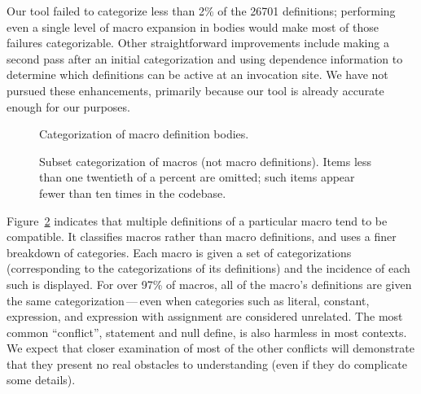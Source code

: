 \documentclass[11pt]{article}
\begin{document}
Our tool failed to categorize less than 2\% of the 26701 definitions;
performing even a single level of macro expansion in bodies would make most
of those failures categorizable.  Other straightforward improvements
include making a second pass after an initial categorization and using
dependence information to determine which definitions can be active at an
invocation site.  We have not pursued these enhancements, primarily because
our tool is already accurate enough for our purposes.


\begin{figure}
\centerline{}
\caption{Categorization of macro definition bodies.}
\label{fig:categorization}
\end{figure}







\begin{figure}
{\small\centerline{}}
\caption{Subset categorization of macros (not macro definitions).   Items
  less than one twentieth of a percent are omitted; such items appear
  fewer than ten times in the codebase.}
\label{fig:subset-categories}
\end{figure}
 
Figure~\ref{fig:subset-categories} indicates that multiple definitions of a
particular macro tend to be compatible.  It classifies macros rather than
macro definitions, and uses a finer breakdown of categories.  Each macro is
given a set of categorizations (corresponding to the categorizations of its
definitions) and the incidence of each such is displayed.  For over 97\% of
macros, all of the macro's definitions are given the same
categorization\,---\,even when categories such as literal, constant,
expression, and expression with assignment are considered unrelated.  The
most common ``conflict'', statement and null define, is also harmless in
most contexts.  We expect that closer examination of most of the other
conflicts will demonstrate that they present no real obstacles to
understanding (even if they do complicate some details).
\end{document}
